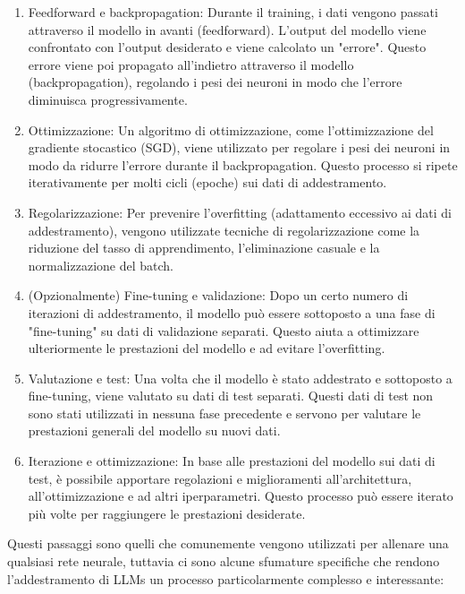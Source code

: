 \begin{enumerate}
\begin{enumerate}
    \end{enumerate}
    \item Feedforward e backpropagation: Durante il training, i dati vengono passati attraverso il modello in avanti (feedforward). L'output del modello viene confrontato con l'output desiderato e viene calcolato un "errore". Questo errore viene poi propagato all'indietro attraverso il modello (backpropagation), regolando i pesi dei neuroni in modo che l'errore diminuisca progressivamente.
    \item Ottimizzazione: Un algoritmo di ottimizzazione, come l'ottimizzazione del gradiente stocastico (SGD), viene utilizzato per regolare i pesi dei neuroni in modo da ridurre l'errore durante il backpropagation. Questo processo si ripete iterativamente per molti cicli (epoche) sui dati di addestramento.
    \item Regolarizzazione: Per prevenire l'overfitting (adattamento eccessivo ai dati di addestramento), vengono utilizzate tecniche di regolarizzazione come la riduzione del tasso di apprendimento, l'eliminazione casuale e la normalizzazione del batch.
    \item (Opzionalmente) Fine-tuning e validazione: Dopo un certo numero di iterazioni di addestramento, il modello può essere sottoposto a una fase di "fine-tuning" su dati di validazione separati. Questo aiuta a ottimizzare ulteriormente le prestazioni del modello e ad evitare l'overfitting.
    \item Valutazione e test: Una volta che il modello è stato addestrato e sottoposto a fine-tuning, viene valutato su dati di test separati. Questi dati di test non sono stati utilizzati in nessuna fase precedente e servono per valutare le prestazioni generali del modello su nuovi dati.
    \item Iterazione e ottimizzazione: In base alle prestazioni del modello sui dati di test, è possibile apportare regolazioni e miglioramenti all'architettura, all'ottimizzazione e ad altri iperparametri. Questo processo può essere iterato più volte per raggiungere le prestazioni desiderate.
\end{enumerate}

Questi passaggi sono quelli che comunemente vengono utilizzati per allenare una qualsiasi rete neurale, tuttavia ci sono alcune sfumature specifiche che rendono l'addestramento di LLMs un processo particolarmente complesso e interessante:

